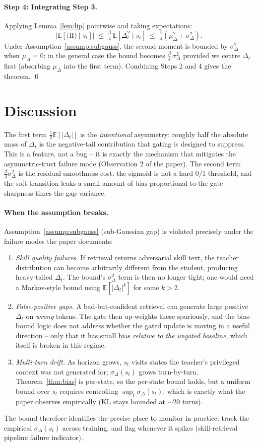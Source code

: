 \documentclass[11pt]{article}
\begin{document}
\paragraph{Step 4: Integrating Step 3.} Applying Lemma~\ref{lem:lip} pointwise and taking expectations:
\[
\left| \mathbb{E}[\text{(II)} \mid s_t] \right| \;\leq\; \tfrac{\beta}{4}\, \mathbb{E}[\Delta_t^2 \mid s_t] \;\leq\; \tfrac{\beta}{4}(\mu_\Delta^2 + \sigma_\Delta^2).
\]
Under Assumption~\ref{assump:subgauss}, the second moment is bounded by $\sigma_\Delta^2$ when $\mu_\Delta = 0$; in the general case the bound becomes $\tfrac{\beta}{4}\, \sigma_\Delta^2$ provided we centre $\Delta_t$ first (absorbing $\mu_\Delta$ into the first term). Combining Steps 2 and 4 gives the theorem. \qed

\section*{Discussion}

The first term $\tfrac{1}{2}\mathbb{E}[|\Delta_t|]$ is the \emph{intentional} asymmetry: roughly half the absolute mass of $\Delta_t$ is the negative-tail contribution that gating is designed to suppress. This is a feature, not a bug -- it is exactly the mechanism that mitigates the asymmetric-trust failure mode (Observation 2 of the paper). The second term $\tfrac{\beta}{4}\sigma_\Delta^2$ is the residual smoothness cost: the sigmoid is not a hard $0/1$ threshold, and the soft transition leaks a small amount of bias proportional to the gate sharpness times the gap variance.

\paragraph{When the assumption breaks.} Assumption~\ref{assump:subgauss} (sub-Gaussian gap) is violated precisely under the failure modes the paper documents:
\begin{enumerate}
  \item \emph{Skill quality failures.} If retrieval returns adversarial skill text, the teacher distribution can become arbitrarily different from the student, producing heavy-tailed $\Delta_t$. The bound's $\sigma_\Delta^2$ term is then no longer tight; one would need a Markov-style bound using $\mathbb{E}[|\Delta_t|^k]$ for some $k > 2$.
  \item \emph{False-positive gaps.} A bad-but-confident retrieval can generate large positive $\Delta_t$ on \emph{wrong} tokens. The gate then up-weights these spuriously, and the bias-bound logic does not address whether the gated update is moving in a useful direction -- only that it has small bias \emph{relative to the ungated baseline}, which itself is broken in this regime.
  \item \emph{Multi-turn drift.} As horizon grows, $s_t$ visits states the teacher's privileged context was not generated for; $\sigma_\Delta(s_t)$ grows turn-by-turn. Theorem~\ref{thm:bias} is per-state, so the per-state bound holds, but a uniform bound over $s_t$ requires controlling $\sup_t \sigma_\Delta(s_t)$, which is exactly what the paper observes empirically (KL stays bounded at $\sim 20$ turns).
\end{enumerate}

The bound therefore identifies the precise place to monitor in practice: track the empirical $\sigma_\Delta(s_t)$ across training, and flag whenever it spikes (skill-retrieval pipeline failure indicator).
\end{document}
